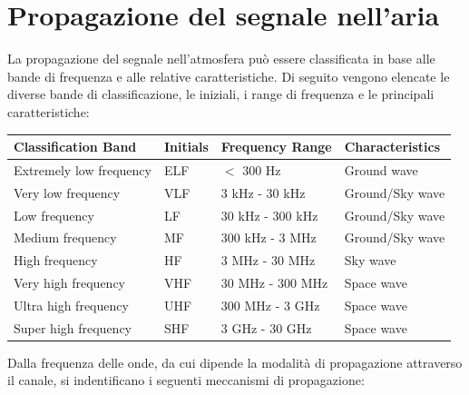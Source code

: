 \section*{Propagazione del segnale nell'aria}
La propagazione del segnale nell'atmosfera può essere classificata in base alle bande di frequenza e alle relative caratteristiche. Di seguito vengono elencate le diverse bande di classificazione, le iniziali, i range di frequenza e le principali caratteristiche:
\begin{table}[h!]
    \centering
    \begin{tabular}{llll}
        \hline
        \textbf{Classification Band} & \textbf{Initials} & \textbf{Frequency Range} & \textbf{Characteristics} \\
        \hline
        Extremely low frequency      & ELF               & $<$ 300 Hz               & Ground wave              \\
        Very low frequency           & VLF               & 3 kHz - 30 kHz           & Ground/Sky wave          \\
        Low frequency                & LF                & 30 kHz - 300 kHz         & Ground/Sky wave          \\
        Medium frequency             & MF                & 300 kHz - 3 MHz          & Ground/Sky wave          \\
        High frequency               & HF                & 3 MHz - 30 MHz           & Sky wave                 \\
        Very high frequency          & VHF               & 30 MHz - 300 MHz         & Space wave               \\
        Ultra high frequency         & UHF               & 300 MHz - 3 GHz          & Space wave               \\
        Super high frequency         & SHF               & 3 GHz - 30 GHz           & Space wave               \\
        \hline
    \end{tabular}
\end{table}


Dalla frequenza delle onde, da cui dipende la modalità di propagazione attraverso il canale, si indentificano i seguenti meccanismi di propagazione:

